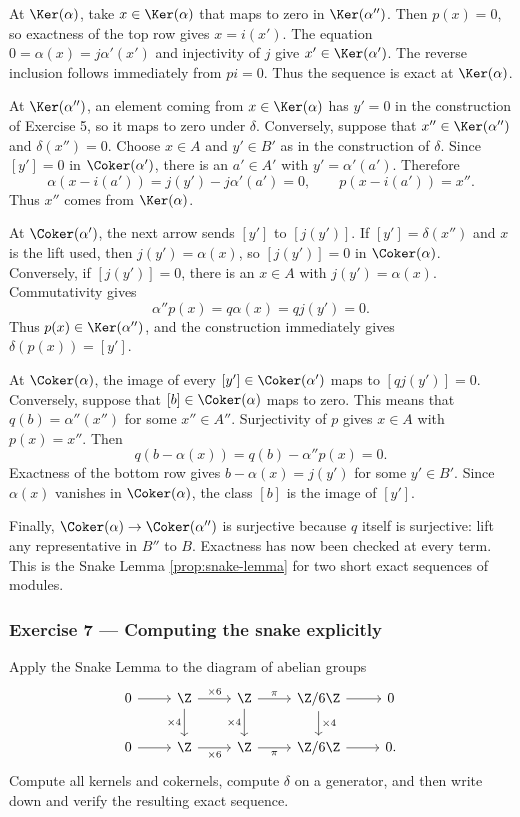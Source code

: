 At $\Ker(\alpha)$, take $x\in\Ker(\alpha)$ that maps to zero in
$\Ker(\alpha'')$. Then $p(x)=0$, so exactness of the top row gives
$x=i(x')$. The equation
$0=\alpha(x)=j\alpha'(x')$ and injectivity of $j$ give
$x'\in\Ker(\alpha')$. The reverse inclusion follows immediately from
$pi=0$. Thus the sequence is exact at $\Ker(\alpha)$.

At $\Ker(\alpha'')$, an element coming from $x\in\Ker(\alpha)$ has
$y'=0$ in the construction of Exercise 5, so it maps to zero under
$\delta$. Conversely, suppose that $x''\in\Ker(\alpha'')$ and
$\delta(x'')=0$. Choose $x\in A$ and $y'\in B'$ as in the construction of
$\delta$. Since $[y']=0$ in $\Coker(\alpha')$, there is an $a'\in A'$ with
$y'=\alpha'(a')$. Therefore
\[
	\alpha(x-i(a'))=j(y')-j\alpha'(a')=0,
	\qquad p(x-i(a'))=x''.
\]
Thus $x''$ comes from $\Ker(\alpha)$.

At $\Coker(\alpha')$, the next arrow sends $[y']$ to $[j(y')]$. If
$[y']=\delta(x'')$ and $x$ is the lift used, then
$j(y')=\alpha(x)$, so $[j(y')]=0$ in $\Coker(\alpha)$. Conversely, if
$[j(y')]=0$, there is an $x\in A$ with $j(y')=\alpha(x)$. Commutativity
gives
\[
	\alpha''p(x)=q\alpha(x)=qj(y')=0.
\]
Thus $p(x)\in\Ker(\alpha'')$, and the construction immediately gives
$\delta(p(x))=[y']$.

At $\Coker(\alpha)$, the image of every $[y']\in\Coker(\alpha')$ maps to
$[qj(y')]=0$. Conversely, suppose that $[b]\in\Coker(\alpha)$ maps to
zero. This means that $q(b)=\alpha''(x'')$ for some $x''\in A''$.
Surjectivity of $p$ gives $x\in A$ with $p(x)=x''$. Then
\[
	q(b-\alpha(x))=q(b)-\alpha''p(x)=0.
\]
Exactness of the bottom row gives $b-\alpha(x)=j(y')$ for some $y'\in B'$.
Since $\alpha(x)$ vanishes in $\Coker(\alpha)$, the class $[b]$ is the
image of $[y']$.

Finally, $\Coker(\alpha)\to\Coker(\alpha'')$ is surjective because $q$
itself is surjective: lift any representative in $B''$ to $B$. Exactness
has now been checked at every term. This is the Snake Lemma
\ref{prop:snake-lemma} for two short exact sequences of modules.

\subsubsection*{Exercise 7 --- Computing the snake explicitly}
\hypertarget{o014.mastery.diagram-chasing.001.ex07}{ }
\label{mastery:diagram-chasing-001-ex07}

Apply the Snake Lemma to the diagram of abelian groups
\[
\begin{tikzcd}
	0 \arrow[r] & \Z \arrow[r, "\times 6"] \arrow[d, "\times 4"'] & \Z \arrow[r, "\pi"] \arrow[d, "\times 4"'] & \Z/6\Z \arrow[r] \arrow[d, "\times 4"] & 0 \\
	0 \arrow[r] & \Z \arrow[r, "\times 6"'] & \Z \arrow[r, "\pi"'] & \Z/6\Z \arrow[r] & 0.
\end{tikzcd}
\]
Compute all kernels and cokernels, compute $\delta$ on a generator, and then
write down and verify the resulting exact sequence.

